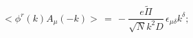 \begin{equation}
<\phi^r \left( k\right) A_{\mu }\left( -k\right) >\, =\, -\frac{e
\tilde{\Pi}}{\sqrt{N}k^2 D}\,\epsilon_{\mu \delta }k^{\delta };\,
\end{equation}

